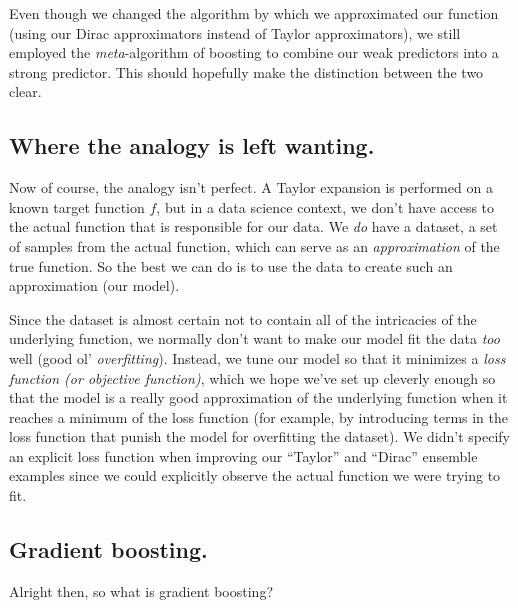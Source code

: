 \documentclass[letterpaper,12pt]{report}
\begin{document}
Even though we changed the algorithm by which we approximated our function (using our Dirac
approximators instead of Taylor approximators), we still employed the \emph{meta}-algorithm
of boosting to combine our weak predictors into a strong predictor. This should hopefully make
the distinction between the two clear.

\subsection{Where the analogy is left wanting.}\label{where-the-analogy-is-left-wanting}

Now of course, the analogy isn't perfect. A Taylor expansion is performed on a known target
function \(f\), but in a data science context, we don't have access to the actual
function that is responsible for our data. We \emph{do} have a dataset, a set of samples from
the actual function, which can serve as an \emph{approximation} of the true function.
So the best we can do is to use the data to create such an approximation (our model). 

Since the dataset is almost certain not to contain all of the intricacies of the underlying
function, we normally don't want to make our model fit the data \emph{too} well
(good ol' \emph{overfitting}). Instead, we tune our model so that it
minimizes a
\emph{loss function (or objective function)}, 
which we hope we've set up cleverly enough so that
the model is a really good approximation of the underlying function when it reaches a minimum
of the loss function (for example, by introducing terms in the loss function that punish the
model for overfitting the dataset). We didn't specify an explicit loss function when
improving our ``Taylor'' and ``Dirac'' ensemble examples since we could explicitly observe the
actual function we were trying to fit.


\subsection{Gradient boosting.}\label{gradient-boosting}



Alright then, so what is gradient boosting? 
\end{document}
